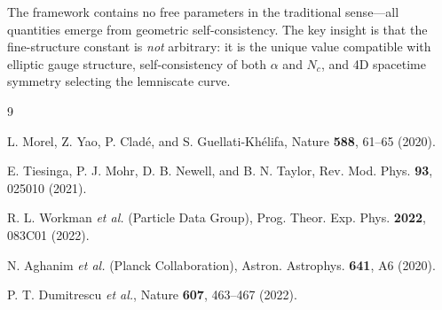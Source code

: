 \documentclass[aps,prd,twocolumn,10pt,groupedaddress,superscriptaddress]{revtex4-2}
\begin{document}
The framework contains no free parameters in the traditional sense---all quantities emerge from geometric self-consistency. The key insight is that the fine-structure constant is \textit{not} arbitrary: it is the unique value compatible with elliptic gauge structure, self-consistency of both $\alpha$ and $N_c$, and 4D spacetime symmetry selecting the lemniscate curve.

\begin{thebibliography}{9}

L. Morel, Z. Yao, P. Clad\'{e}, and S. Guellati-Kh\'{e}lifa,
Nature \textbf{588}, 61--65 (2020).

E. Tiesinga, P. J. Mohr, D. B. Newell, and B. N. Taylor,
Rev. Mod. Phys. \textbf{93}, 025010 (2021).

R. L. Workman \textit{et al.} (Particle Data Group),
Prog. Theor. Exp. Phys. \textbf{2022}, 083C01 (2022).

N. Aghanim \textit{et al.} (Planck Collaboration),
Astron. Astrophys. \textbf{641}, A6 (2020).

P. T. Dumitrescu \textit{et al.},
Nature \textbf{607}, 463--467 (2022).

\end{thebibliography}
\end{document}
